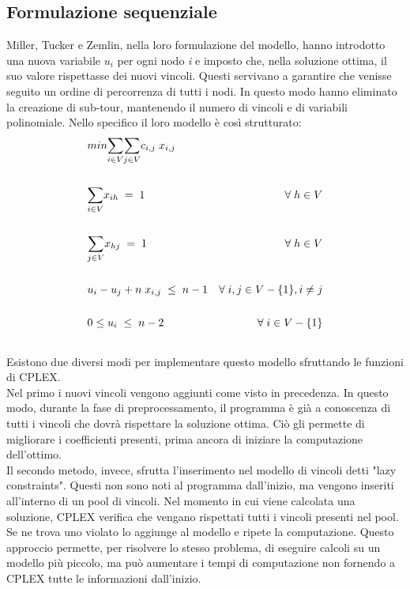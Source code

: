 \subsection{Formulazione sequenziale}
Miller, Tucker e Zemlin, nella loro formulazione del modello, hanno introdotto una nuova variabile $u_i$ per ogni nodo \textit{i} e imposto che, nella soluzione ottima, il suo valore  rispettasse dei nuovi vincoli. Questi servivano a garantire che venisse seguito un ordine di percorrenza di tutti i nodi. In questo modo hanno eliminato la creazione di sub-tour, mantenendo il numero di vincoli e di variabili polinomiale. Nello specifico il loro modello è così strutturato:
\begin{align}
& min \underset{i\in V}\sum{}\underset{j\in V}\sum{c_{i,j}\; x_{i,j}} \\ \notag \\
& \underset{i\in V}\sum{x_{ih}}\; =\; 1 & \forall\; h\in V \\ \notag \\
& \underset{j\in V}\sum{x_{hj}}\; =\; 1 & \forall\; h\in V \\ \notag \\
& u_i-u_j+n\; x_{i,j}\;\leq\; n-1 & \forall\; i,j\in V-\{ 1\} , i\neq j \\ \notag \\
& 0\leq u_i\;\leq\; n-2 & \forall\; i\in V-\{ 1\} \\ \notag 
\end{align}
Esistono due diversi modi per implementare questo modello sfruttando le funzioni di CPLEX.\\
Nel primo i nuovi vincoli vengono aggiunti come visto in precedenza. In questo modo, durante la fase di preprocessamento, il programma è già a conoscenza di tutti i vincoli che dovrà rispettare la soluzione ottima. Ciò gli permette di migliorare i coefficienti presenti, prima ancora di iniziare la computazione dell'ottimo.\\
Il secondo metodo, invece, sfrutta l'inserimento nel modello di vincoli detti "lazy constraints". Questi non sono noti al programma dall'inizio, ma vengono inseriti all'interno di un pool di vincoli. Nel momento in cui viene calcolata una soluzione, CPLEX verifica che vengano rispettati tutti i vincoli presenti nel pool. Se ne trova uno violato lo aggiunge al modello e ripete la computazione. Questo approccio permette, per risolvere lo stesso problema, di eseguire calcoli su un modello più piccolo, ma può aumentare i tempi di computazione non fornendo a CPLEX tutte le informazioni dall'inizio.   

